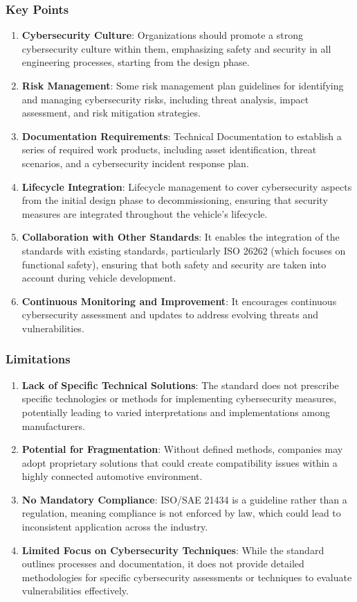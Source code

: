 \subsubsection{Key Points}\label{subsubsec:key-points-1}
\begin{enumerate}
    \item \textbf{Cybersecurity Culture}: Organizations should promote a strong cybersecurity culture within them, emphasizing safety and security in all engineering processes, starting from the design phase.
    \item \textbf{Risk Management}: Some risk management plan guidelines for identifying and managing cybersecurity risks, including threat analysis, impact assessment, and risk mitigation strategies.
    \item \textbf{Documentation Requirements}: Technical Documentation to establish a series of required work products, including asset identification, threat scenarios, and a cybersecurity incident response plan.
    \item \textbf{Lifecycle Integration}: Lifecycle management to cover cybersecurity aspects from the initial design phase to decommissioning, ensuring that security measures are integrated throughout the vehicle's lifecycle.
    \item \textbf{Collaboration with Other Standards}: It enables the integration of the standards with existing standards, particularly ISO 26262 (which focuses on functional safety), ensuring that both safety and security are taken into account during vehicle development.
    \item \textbf{Continuous Monitoring and Improvement}: It encourages continuous cybersecurity assessment and updates to address evolving threats and vulnerabilities.
\end{enumerate}

\subsubsection{Limitations}\label{subsubsec:limitations}
\begin{enumerate}
    \item \textbf{Lack of Specific Technical Solutions}: The standard does not prescribe specific technologies or methods for implementing cybersecurity measures, potentially leading to varied interpretations and implementations among manufacturers.
    \item \textbf{Potential for Fragmentation}: Without defined methods, companies may adopt proprietary solutions that could create compatibility issues within a highly connected automotive environment.
    \item \textbf{No Mandatory Compliance}: ISO/SAE 21434 is a guideline rather than a regulation, meaning compliance is not enforced by law, which could lead to inconsistent application across the industry.
    \item \textbf{Limited Focus on Cybersecurity Techniques}: While the standard outlines processes and documentation, it does not provide detailed methodologies for specific cybersecurity assessments or techniques to evaluate vulnerabilities effectively.
\end{enumerate}


